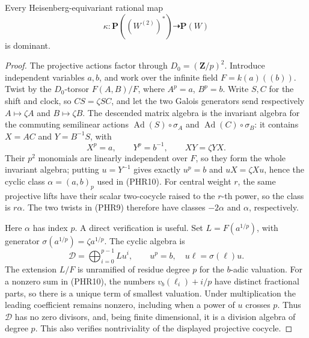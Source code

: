 \begin{lemma}
\label{lem:prime-Heisenberg-projective-dominance}
Every Heisenberg-equivariant rational map
\[
            \kappa:\mathbf P((W^{(2)})^*)\dashrightarrow
                              \mathbf P(W)             \tag{PHR9}
\]
is dominant.
\end{lemma}
\begin{proof}
The projective actions factor through
\(D_0=(\mathbf Z/p)^2\). Introduce independent variables \(a,b\),
and work over the infinite field \(F=k(a)((b))\).
Twist by the \(D_0\)-torsor \(F(A,B)/F\), where
\(A^p=a\), \(B^p=b\). Write \(S,C\) for the shift and clock,
so \(CS=\zeta SC\), and let the two Galois generators send
respectively \(A\mapsto\zeta A\) and \(B\mapsto\zeta B\).
The descended matrix algebra is the invariant algebra for the
commuting semilinear actions
\(\operatorname{Ad}(S)\circ\sigma_A\) and
\(\operatorname{Ad}(C)\circ\sigma_B\): it contains
\(X=AC\) and \(Y=B^{-1}S\), with
\[
       X^p=a,\qquad Y^p=b^{-1},\qquad XY=\zeta YX.
\]
Their \(p^2\) monomials are linearly independent over \(F\),
so they form the whole invariant algebra; putting \(u=Y^{-1}\)
gives exactly \(u^p=b\) and \(uX=\zeta Xu\), hence the cyclic
class \(\alpha=(a,b)_p\) used in (PHR10).
For central weight \(r\), the same projective lifts have their
scalar two-cocycle raised to the \(r\)-th power, so the class is
\(r\alpha\). The two twists in (PHR9) therefore have classes
\(-2\alpha\) and \(\alpha\), respectively.

Here \(\alpha\) has index \(p\). A direct verification is useful.
Set \(L=F(a^{1/p})\), with generator
\(\sigma(a^{1/p})=\zeta a^{1/p}\). The cyclic algebra is
\[
 \mathcal D=\bigoplus_{i=0}^{p-1}L u^i,\qquad
       u^p=b,\quad u\ell=\sigma(\ell)u.           \tag{PHR10}
\]
The extension \(L/F\) is unramified of residue degree \(p\)
for the \(b\)-adic valuation. For a nonzero sum in (PHR10),
the numbers \(v_b(\ell_i)+i/p\) have distinct fractional parts,
so there is a unique term of smallest valuation. Under
multiplication the leading coefficient remains nonzero, including
when a power of \(u\) crosses \(p\). Thus \(\mathcal D\) has no
zero divisors, and, being finite dimensional, it is a division
algebra of degree \(p\). This also verifies nontriviality of
the displayed projective cocycle.


\end{proof}
